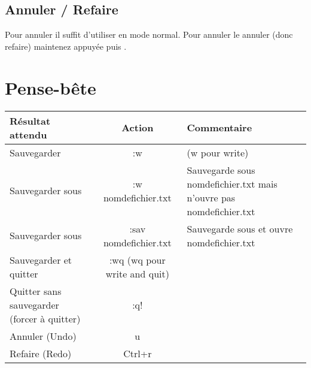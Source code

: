 \subsection{Annuler / Refaire}

Pour annuler il suffit d'utiliser \ttu en mode normal. Pour annuler le annuler (donc refaire) maintenez \ttctrl appuyée puis \ttr.

\section{Pense-bête}

\bigskip
\begin{tabularx}{17cm}{|X|c|X|}
  \hline
  Résultat attendu & Action & Commentaire \\
  \hline \hline
  Sauvegarder & :w & (w pour write)\\
  \hline
  Sauvegarder sous & :w nomdefichier.txt & Sauvegarde sous nomdefichier.txt mais n'ouvre pas nomdefichier.txt \\
  \hline
  Sauvegarder sous & :sav nomdefichier.txt & Sauvegarde sous et ouvre nomdefichier.txt  \\
  \hline
  Sauvegarder et quitter & :wq (wq pour write and quit) & \\
  \hline
  Quitter sans sauvegarder (forcer à quitter) & :q! & \\
  \hline
  Annuler (Undo) & u & \\
  \hline
  Refaire (Redo) & Ctrl+r & \\
  \hline
\end{tabularx}
\bigskip

